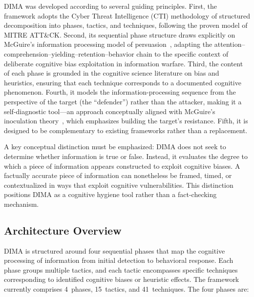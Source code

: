 \documentclass[11pt,a4paper]{article}
\begin{document}
DIMA was developed according to several guiding principles. First, the framework adopts the Cyber Threat Intelligence (CTI) methodology of structured decomposition into phases, tactics, and techniques, following the proven model of MITRE ATT\&CK. Second, its sequential phase structure draws explicitly on McGuire's information processing model of persuasion~\cite{mcguire1968, mcguire1969}, adapting the attention--comprehension--yielding--retention--behavior chain to the specific context of deliberate cognitive bias exploitation in information warfare. Third, the content of each phase is grounded in the cognitive science literature on bias and heuristics, ensuring that each technique corresponds to a documented cognitive phenomenon. Fourth, it models the information-processing sequence from the perspective of the target (the ``defender'') rather than the attacker, making it a self-diagnostic tool---an approach conceptually aligned with McGuire's inoculation theory~\cite{mcguire1961}, which emphasizes building the target's resistance. Fifth, it is designed to be complementary to existing frameworks rather than a replacement.

A key conceptual distinction must be emphasized: DIMA does not seek to determine whether information is true or false. Instead, it evaluates the degree to which a piece of information appears constructed to exploit cognitive biases. A factually accurate piece of information can nonetheless be framed, timed, or contextualized in ways that exploit cognitive vulnerabilities. This distinction positions DIMA as a cognitive hygiene tool rather than a fact-checking mechanism.

\subsection{Architecture Overview}

DIMA is structured around four sequential phases that map the cognitive processing of information from initial detection to behavioral response. Each phase groups multiple tactics, and each tactic encompasses specific techniques corresponding to identified cognitive biases or heuristic effects. The framework currently comprises 4~phases, 15~tactics, and 41~techniques. The four phases are:
\end{document}

